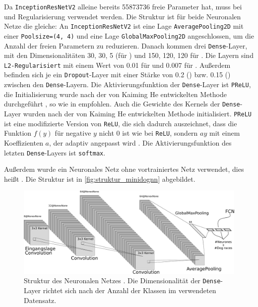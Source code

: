 Da \texttt{InceptionResNetV2} alleine bereits 55873736 freie Parameter hat, muss
bei \PreBig und \PreDog Regularisierung verwendet werden. Die Struktur ist für
beide Neuronalen Netze die gleiche: An \texttt{InceptionResNetV2} ist eine Lage
\texttt{AveragePooling2D} mit einer \texttt{Poolsize=(4, 4)} und eine Lage
\texttt{GlobalMaxPooling2D} angeschlossen, um die Anzahl der freien Parametern
zu reduzieren. Danach kommen drei \texttt{Dense}-Layer, mit den
Dimensionalitäten 30, 30, 5 (für \PreDog) und 150, 120, 120 für \PreBig. Die
Layern sind \texttt{L2-Regularisiert} mit einem Wert von 0.01 für \PreDog und
0.007 für \PreBig. Außerdem befinden sich je ein \texttt{Dropout}-Layer mit
einer Stärke von 0.2 (\PreDog) bzw. 0.15 (\PreBig) zwischen den
\texttt{Dense}-Layern. Die Aktivierungsfunktion der \texttt{Dense}-Layer ist
\texttt{PReLU}, die Initialisierung wurde nach der von Kaiming He entwickelten
Methode durchgeführt \cite{tensowflow-he}, so wie in \cite{he-ini} empfohlen.
Auch die Gewichte des Kernels der \texttt{Dense}-Layer wurden nach der von
Kaiming He entwickelten Methode initialisiert. \texttt{PReLU} ist eine
modifizierte Version von \texttt{ReLU}, die sich dadurch auszeichnet, dass die
Funktion $f(y)$ für negative $y$ nicht 0 ist wie bei \texttt{ReLU}, sondern $ay$
mit einem Koeffizienten $a$, der adaptiv angepasst wird \cite{prelu}. Die
Aktivierungsfunktion des letzten \texttt{Dense}-Layers ist \texttt{softmax}.

Außerdem wurde ein Neuronales Netz ohne vortrainiertes Netz verwendet, dies heißt
\MiniDog. Die Struktur ist in \autoref{fig:struktur_minidognn} abgebildet.

\begin{figure}
  \centering
  \includegraphics[width=\textwidth]{pics/nn.pdf}
  \caption{Struktur des Neuronalen Netzes \MiniDog. Die Dimensionalität
  der \texttt{Dense}-Layer richtet sich nach der Anzahl der Klassen im verwendeten Datensatz.}
  \label{fig:struktur_minidognn}
\end{figure}

